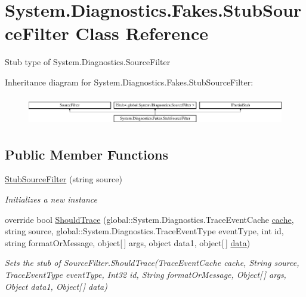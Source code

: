 \hypertarget{class_system_1_1_diagnostics_1_1_fakes_1_1_stub_source_filter}{\section{System.\-Diagnostics.\-Fakes.\-Stub\-Source\-Filter Class Reference}
\label{class_system_1_1_diagnostics_1_1_fakes_1_1_stub_source_filter}
}


Stub type of System.\-Diagnostics.\-Source\-Filter 


Inheritance diagram for System.\-Diagnostics.\-Fakes.\-Stub\-Source\-Filter\-:\begin{figure}[H]
\begin{center}
\leavevmode
\includegraphics[height=1.274175cm]{class_system_1_1_diagnostics_1_1_fakes_1_1_stub_source_filter}
\end{center}
\end{figure}
\subsection*{Public Member Functions}
\begin{DoxyCompactItemize}
\item 
\hyperlink{class_system_1_1_diagnostics_1_1_fakes_1_1_stub_source_filter_afdd1388574ac4f6878b9987918868023}{Stub\-Source\-Filter} (string source)
\begin{DoxyCompactList}\small\item\em Initializes a new instance\end{DoxyCompactList}\item 
override bool \hyperlink{class_system_1_1_diagnostics_1_1_fakes_1_1_stub_source_filter_af6c7bab0af8c7f45710fe8036c5b5286}{Should\-Trace} (global\-::\-System.\-Diagnostics.\-Trace\-Event\-Cache \hyperlink{jquery-1_810_82-vsdoc_8js_acdb445beb9aa4c6dbdf28258e18dbb58}{cache}, string source, global\-::\-System.\-Diagnostics.\-Trace\-Event\-Type event\-Type, int id, string format\-Or\-Message, object\mbox{[}$\,$\mbox{]} args, object data1, object\mbox{[}$\,$\mbox{]} \hyperlink{jquery-1_810_82-vsdoc_8js_a609407b3456fdc3c5671a9fc4a226ff7}{data})
\begin{DoxyCompactList}\small\item\em Sets the stub of Source\-Filter.\-Should\-Trace(\-Trace\-Event\-Cache cache, String source, Trace\-Event\-Type event\-Type, Int32 id, String format\-Or\-Message, Object\mbox{[}$\,$\mbox{]} args, Object data1, Object\mbox{[}$\,$\mbox{]} data)\end{DoxyCompactList}\end{DoxyCompactItemize}
